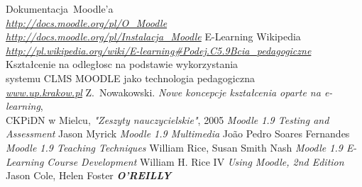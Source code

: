 \documentclass[a4paper,12pt]{report}
\begin{document}
\begin{thebibliography}{99}
	 Dokumentacja~Moodle'a \\
	\textit{\href{http://docs.moodle.org/pl/O\_Moodle}{http://docs.moodle.org/pl/O\_Moodle}} \\
	\textit{\href{http://docs.moodle.org/pl/Instalacja\_Moodle}{http://docs.moodle.org/pl/Instalacja\_Moodle}}
	 E-Learning Wikipedia \\
	\textit{\href{http://pl.wikipedia.org/wiki/E-learning\#Podej.C5.9Bcia\_pedagogiczne}{http://pl.wikipedia.org/wiki/E-learning\#Podej.C5.9Bcia\_pedagogiczne}}
	  Kształcenie na odległosc na podstawie wykorzystania \\systemu CLMS MOODLE jako technologia pedagogiczna\\
	\textit{\href{http://www.up.krakow.pl/ktime/ref2007/Smyrnova.pdf}{www.up.krakow.pl}}
	 Z.~Nowakowski. \textit{Nowe koncepcje kształcenia oparte na e-learning},\\CKPiDN w Mielcu, \textit{"Zeszyty nauczycielskie"}, 2005
	 \textit{Moodle 1.9 Testing and Assessment} Jason Myrick
	 \textit{Moodle 1.9 Multimedia} João Pedro Soares Fernandes
	 \textit{Moodle 1.9 Teaching Techniques} William Rice, Susan Smith Nash
	 \textit{Moodle 1.9 E-Learning Course Development} William H. Rice IV
	 \textit{Using Moodle, 2nd Edition} Jason Cole, Helen Foster \textbf{\textit{O'REILLY}}
\end{thebibliography}
	\listoffigures
	\listoftables
\end{document}
